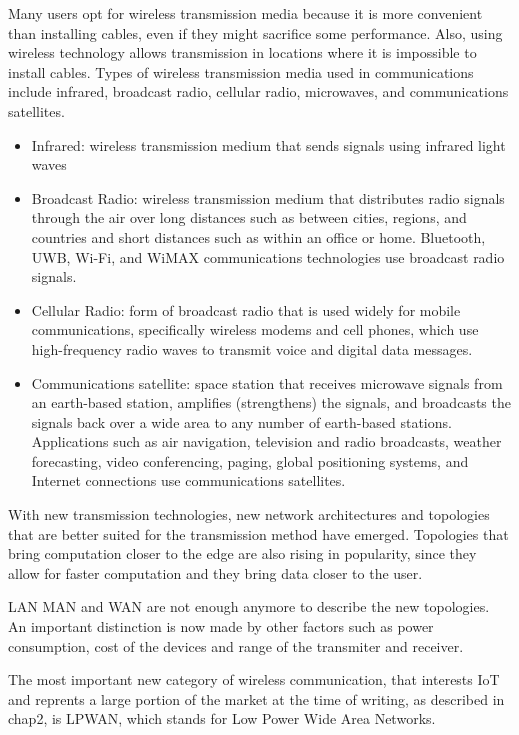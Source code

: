 		Many users opt for wireless transmission media because it is more convenient than installing cables, even if they might sacrifice some performance. 
		Also, using wireless technology allows transmission in locations where it is impossible to install cables.
		Types of wireless transmission media used in communications include infrared, broadcast radio, cellular radio, microwaves, and communications satellites.
		\begin{itemize}[noitemsep]
			\item Infrared: wireless transmission medium that sends signals using infrared light waves
			\item Broadcast Radio: wireless transmission medium that distributes radio signals through the air over long distances such as between cities, regions, and countries and short distances such as within an office or home. Bluetooth, UWB, Wi-Fi, and WiMAX communications technologies use broadcast radio signals.
			\item Cellular Radio: form of broadcast radio that is used widely for mobile communications, specifically wireless modems and cell phones, which use high-frequency radio waves to transmit voice and digital data messages.
			\item Communications satellite: space station that receives microwave signals from an earth-based station, amplifies (strengthens) the signals, and broadcasts the signals back over a wide area to any number of earth-based stations.
			Applications such as air navigation, television and radio broadcasts, weather forecasting, video conferencing, paging, global positioning systems, and Internet connections use communications satellites.
		\end{itemize}
		
		With new transmission technologies, new network architectures and topologies that are better suited for the transmission method have emerged.
		Topologies that bring computation closer to the edge are also rising in popularity, since they allow for faster computation and they bring data closer to the user.
		
		LAN MAN and WAN are not enough anymore to describe the new topologies.
		An important distinction is now made by other factors such as power consumption, cost of the devices and range of the transmiter and receiver.
		
		The most important new category of wireless communication, that interests IoT and reprents a large portion of the market at the time of writing, as described in chap2, is LPWAN, which stands for Low Power Wide Area Networks.
		
